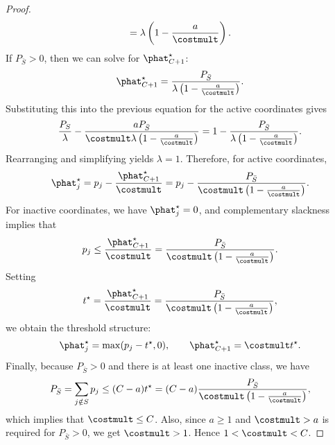 \begin{proof}
\begin{align*}
        =
        \lambda\left(1-\frac{a}{\costmult}\right).
    \end{align*}
    If $P_{\bar{S}}>0$, then we can solve for $\phat^{\star}_{C+1}$:
    \begin{align*}
        \phat^{\star}_{C+1}
        =
        \frac{P_{\bar{S}}}{\lambda\left(1-\frac{a}{\costmult}\right)}.
    \end{align*}
    Substituting this into the previous equation for the active coordinates gives
    \begin{align*}
        \frac{P_S}{\lambda}-\frac{a P_{\bar{S}}}{\costmult \lambda\left(1-\frac{a}{\costmult}\right)}=1-\frac{P_{\bar{S}}}{\lambda\left(1-\frac{a}{\costmult}\right)}.
    \end{align*}
    Rearranging and simplifying yields $\lambda=1$. Therefore, for active coordinates,
    \begin{align*}
        \phat^{\star}_j
        =
        p_j-\frac{\phat^{\star}_{C+1}}{\costmult}
        =
        p_j-\frac{P_{\bar{S}}}{\costmult\left(1-\frac{a}{\costmult}\right)}.
    \end{align*}
    For inactive coordinates, we have $\phat^{\star}_j=0$, and complementary slackness implies that
    \begin{align*}
        p_j\le\frac{\phat^{\star}_{C+1}}{\costmult}
        =
        \frac{P_{\bar{S}}}{\costmult\left(1-\frac{a}{\costmult}\right)}.
    \end{align*}
    Setting
    \begin{align*}
        t^\star=\frac{\phat^{\star}_{C+1}}{\costmult}=\frac{P_{\bar{S}}}{\costmult\left(1-\frac{a}{\costmult}\right)},
    \end{align*}
    we obtain the threshold structure:
    \begin{align*}
        \phat^{\star}_j
        =
        \max(p_j-t^\star,0),
        \qquad
        \phat^{\star}_{C+1}
        =
        \costmult t^\star.
    \end{align*}
    Finally, because $P_{\bar{S}}>0$ and there is at least one inactive class, we have
    \begin{align*}
        P_{\bar{S}}
        =
        \sum_{j\notin S} p_j
        \le
        (C-a) t^\star
        =
        (C-a)\frac{P_{\bar{S}}}{\costmult\left(1-\frac{a}{\costmult}\right)},
    \end{align*}
    which implies that $\costmult\le C$. Also, since $a\ge 1$ and $\costmult>a$ is required for $P_{\bar{S}}>0$, we get $\costmult>1$. Hence $1<\costmult<C$.
\end{proof}

